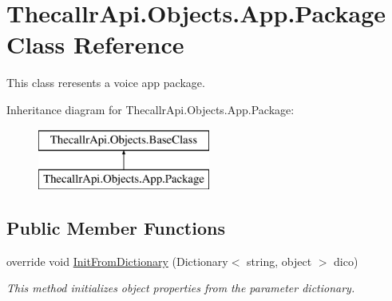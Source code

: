 \hypertarget{class_thecallr_api_1_1_objects_1_1_app_1_1_package}{\section{Thecallr\+Api.\+Objects.\+App.\+Package Class Reference}
\label{class_thecallr_api_1_1_objects_1_1_app_1_1_package}
}


This class reresents a voice app package.  


Inheritance diagram for Thecallr\+Api.\+Objects.\+App.\+Package\+:\begin{figure}[H]
\begin{center}
\leavevmode
\includegraphics[height=2.000000cm]{class_thecallr_api_1_1_objects_1_1_app_1_1_package}
\end{center}
\end{figure}
\subsection*{Public Member Functions}
\begin{DoxyCompactItemize}
\item 
override void \hyperlink{class_thecallr_api_1_1_objects_1_1_app_1_1_package_a494b808024d6f7c3a6e496ae22170c99}{Init\+From\+Dictionary} (Dictionary$<$ string, object $>$ dico)
\begin{DoxyCompactList}\small\item\em This method initializes object properties from the parameter dictionary. \end{DoxyCompactList}\end{DoxyCompactItemize}
